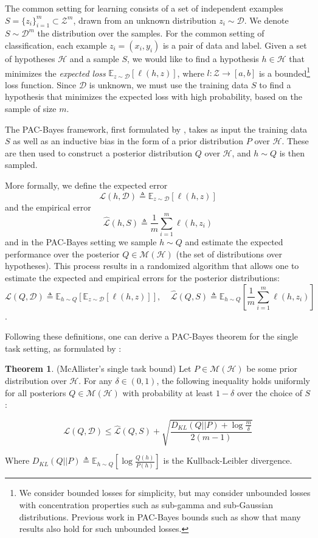 \documentclass{article}
\theoremstyle{definition}
\newtheorem{theorem}{Theorem}[section]
\newcommand{\Expect}[2]{\mathbb{E}_{#1}\left [#2 \right ]}
\begin{document}
The common setting for learning consists of a set of independent examples $S=\{z_i\}_{i=1}^{m}\subset \mathcal{Z}^m$, drawn from an unknown distribution $z_i\sim \mathcal{D}$. We denote $S\sim \mathcal{D}^m$ the distribution over the samples. 
For the common setting of classification, each example $z_i=(x_i,y_i)$ is a pair of data and label.
Given a set of hypotheses $\mathcal{H}$ and a sample $S$, we would like to find a hypothesis $h\in \mathcal{H}$ that minimizes the \emph{expected loss} $\Expect{z\sim \mathcal{D}}{\ell(h,z)}$, where $l:\mathcal{Z}\rightarrow [a,b]$ is a bounded\footnote{We consider bounded losses for simplicity, but may consider unbounded losses with concentration properties such as sub-gamma and sub-Gaussian distributions. Previous work in PAC-Bayes bounds such as \citet{Rothfuss2020} show that many results also hold for such unbounded losses.} loss function.
Since $\mathcal{D}$ is unknown, we must use the training data $S$ to find a hypothesis that minimizes the expected loss with high probability, based on the sample of size $m$.

The PAC-Bayes framework, first formulated by \citet{Mcallester}, takes as input the training data $S$ as well as an inductive bias in the form of a prior distribution $P$ over $\mathcal{H}$. These are then used to construct a posterior distribution $Q$ over $\mathcal{H}$, and $h\sim Q$ is then sampled.

More formally, we define the expected error $$\mathcal{L}(h, \mathcal{D})\triangleq \Expect{z\sim \mathcal{D}}{\ell(h,z)}$$ and the empirical error $$\hat{\mathcal{L}}(h, S)\triangleq \frac{1}{m}\sum_{i=1}^{m} \ell(h,z_i)$$ and in the PAC-Bayes setting we sample $h\sim Q$ and estimate the expected performance over the posterior $Q\in \mathcal{M}(\mathcal{H})$ (the set of distributions over hypotheses). This process results in a randomized algorithm that allows one to estimate the expected and empirical errors for the posterior distributions:
$$\mathcal{L}(Q, \mathcal{D})\triangleq \Expect{h\sim Q}{\Expect{z\sim \mathcal{D}}{\ell(h,z)}}, \;\;\;\; \hat{\mathcal{L}}(Q, S)\triangleq \Expect{h\sim Q}{\frac{1}{m}\sum_{i=1}^{m} \ell(h,z_i)}$$.

Following these definitions, one can derive a PAC-Bayes theorem for the single task setting, as formulated by \citet{Mcallester}:

\begin{theorem} (McAllister's single task bound) \label{thm:classic-pb}
	Let $P\in \mathcal{M}(\mathcal{H})$ be some prior distribution over $\mathcal{H}$.
	For any $\delta \in (0,1)$, the following inequality holds uniformly for all posteriors $Q\in \mathcal{M}(\mathcal{H})$ with probability at least $1-\delta$ over the choice of $S$:
	
	$$\mathcal{L}(Q, \mathcal{D}) \leq \hat{\mathcal{L}}(Q, S)+\sqrt{\frac{D_{KL}(Q||P)+\log\frac{m}{\delta}}{2(m-1)}}$$
	
	Where $D_{KL}(Q||P)\triangleq \Expect{h\sim Q}{\log\frac{Q(h)}{P(h)}}$ is the Kullback-Leibler divergence.
\end{theorem}
\end{document}
